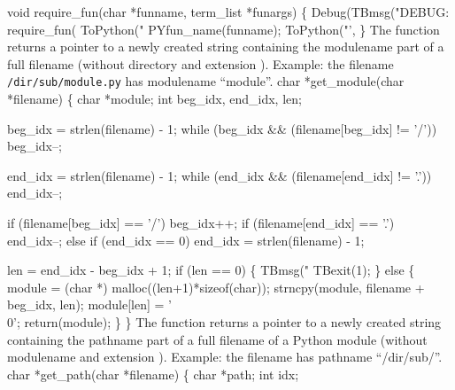 void require_fun(char *funname, term_list *funargs) \{
  Debug(TBmsg("DEBUG: require_fun(%
  ToPython("%
  PYfun_name(funname);
  ToPython("',%
\}
\nwendcode{}\nwdocspar
The  function returns a pointer to a newly created
string containing the modulename part of a full filename (without
directory and extension ).  Example: the filename {\tt
  /dir/sub/module.py} has modulename ``module''.
\nwenddocs{}\plusendmoddef\nwstartdeflinemarkup{}\nwenddeflinemarkup
char *get_module(char *filename) \{
  char *module;
  int beg_idx, end_idx, len;

  beg_idx = strlen(filename) - 1;
  while (beg_idx && (filename[beg_idx] != '/')) beg_idx--;

  end_idx = strlen(filename) - 1;
  while (end_idx && (filename[end_idx] != '.')) end_idx--;

  if (filename[beg_idx] == '/') beg_idx++;
  if (filename[end_idx] == '.') end_idx--;
  else if (end_idx == 0)          end_idx = strlen(filename) - 1;

  len = end_idx - beg_idx + 1;
  if (len == 0) \{
    TBmsg("%
    TBexit(1);
  \} else \{
    module = (char *) malloc((len+1)*sizeof(char));
    strncpy(module, filename + beg_idx, len);
    module[len] = '\\0';
    return(module);
  \}
\}
\nwendcode{}\nwdocspar
The  function returns a pointer to a newly created
string containing the pathname part of a full filename of a Python
module (without modulename and extension ). Example: the
filename  has pathname ``/dir/sub/''.
\nwenddocs{}\plusendmoddef\nwstartdeflinemarkup{}\nwenddeflinemarkup
char *get_path(char *filename) \{
  char *path;
  int idx;  
  
